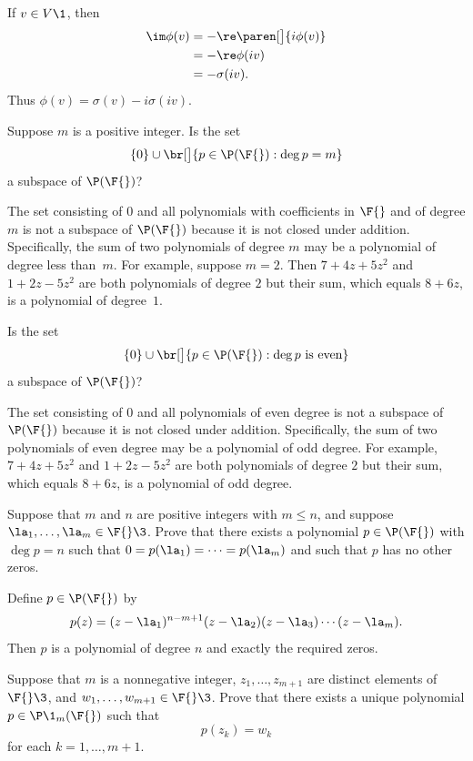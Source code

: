 \begin{Solution}
If $v \in V\1$, then
\begin{align*}
\im \phi(v) &= - \re \paren[\big]{i\phi(v)}\\
&= - \re \phi(iv) \\
&= - \sigma(iv).
\end{align*}
Thus $\phi(v) = \sigma(v) - i \sigma(iv)$.
\end{Solution}

\exercise
Suppose $m$ is a positive integer.  Is the set
\[
\{0\} \cup \br[\big]{p \in \P(\F{}): \deg p = m}
\]
a subspace of $\P(\F{})$?

\begin{Solution}
The set consisting of $0$ and all
polynomials with coefficients in $\F{}$ and of degree $m$ is not a
subspace of $\P(\F{})$ because it is not closed under addition.  Specifically,
the sum of two polynomials of degree $m$ may be a polynomial of degree less
than~$m$.  For example, suppose $m = 2$.  Then $7 + 4z + 5z^2$ and
$1 + 2z - 5z^2$ are both polynomials of degree $2$ but their sum, which equals
$8 + 6z$, is a polynomial of degree~$1$.
\end{Solution}

\exercise
Is the set
\[
\{0\} \cup \br[\big]{p \in \P(\F{}): \deg p \text{ is even}}
\]
a subspace of $\P(\F{})$?

\begin{Solution}
The set consisting of $0$ and all polynomials of even degree is not a subspace of $\P(\F{})$ because it is not closed under addition.  Specifically, the sum of two polynomials of even degree may be a polynomial of odd degree.  For example, $7 + 4z + 5z^2$ and
$1 + 2z - 5z^2$ are both polynomials of degree $2$ but their sum, which equals $8 + 6z$, is a polynomial of odd degree.
\end{Solution}

\exercise
Suppose that $m$ and $n$ are positive integers with $m \le n$, and suppose $\la_1, \dots, \la_m \in \F{}\3$. Prove that there exists a polynomial $p \in \P(\F{})$ with $\deg p = n$ such that $0 = p(\la_1) = \dots = p(\la_m)$ and such that $p$ has no other zeros.

\begin{Solution}
Define $p \in \P(\F{})$ by
\[
p(z) = (z-\la_1)^{n-m+1} (z-\la_2) (z-\la_3) \dotsm (z-\la_m).
\]
Then $p$ is a polynomial of degree $n$ and exactly the required zeros.
\end{Solution}

\exercise
Suppose that $m$ is a nonnegative integer, $z_1, \dots, z_{m+1}$ are distinct elements of $\F{}\3$, and
$w_1, \dots, w_{m+1} \in \F{}\3$.  Prove that there exists a unique polynomial
$p \in \P\1_m(\F{})$ such that \label{PolyInterpolation}
\[
p(z_k) = w_k
\]
for each $k = 1, \dots, m + 1$.

